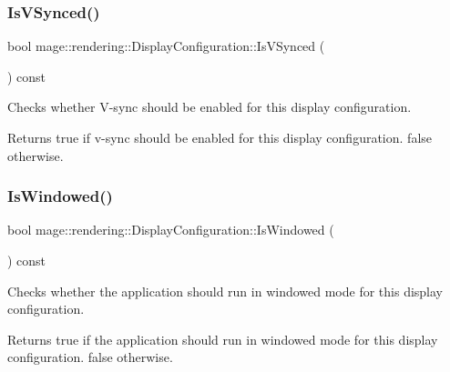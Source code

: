 \subsubsection{\texorpdfstring{Is\+V\+Synced()}{IsVSynced()}}
{\footnotesize\ttfamily bool mage\+::rendering\+::\+Display\+Configuration\+::\+Is\+V\+Synced (\begin{DoxyParamCaption}{ }\end{DoxyParamCaption}) const\hspace{0.3cm}{\ttfamily [noexcept]}}

Checks whether V-\/sync should be enabled for this display configuration.

\begin{DoxyReturn}{Returns}
{\ttfamily true} if v-\/sync should be enabled for this display configuration. {\ttfamily false} otherwise. 
\end{DoxyReturn}
\mbox{\label{classmage_1_1rendering_1_1_display_configuration_acbe793e625311707e234fcd0977978d5}} 
\subsubsection{\texorpdfstring{Is\+Windowed()}{IsWindowed()}}
{\footnotesize\ttfamily bool mage\+::rendering\+::\+Display\+Configuration\+::\+Is\+Windowed (\begin{DoxyParamCaption}{ }\end{DoxyParamCaption}) const\hspace{0.3cm}{\ttfamily [noexcept]}}

Checks whether the application should run in windowed mode for this display configuration.

\begin{DoxyReturn}{Returns}
{\ttfamily true} if the application should run in windowed mode for this display configuration. {\ttfamily false} otherwise. 
\end{DoxyReturn}
\mbox{\label{classmage_1_1rendering_1_1_display_configuration_a847151bc6a61f320811e915119f38f9f}} 
